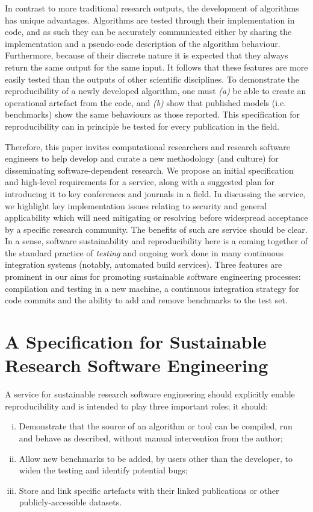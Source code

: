 \documentclass[conference]{IEEEtran}
\begin{document}
In contrast to more traditional research outputs, the development of
algorithms has unique advantages. Algorithms are tested through their
implementation in code, and as such they can be accurately
communicated either by sharing the implementation and a pseudo-code
description of the algorithm behaviour. Furthermore, because of their
discrete nature it is expected that they always return the same output
for the same input. It follows that these features are more easily
tested than the outputs of other scientific disciplines. To
demonstrate the reproducibility of a newly developed algorithm, one
must {\emph{(a)}} be able to create an operational artefact from the
code, and {\emph{(b)}} show that published models (i.e. benchmarks)
show the same behaviours as those reported. This specification for
reproducibility can in principle be tested for every publication in
the field.

Therefore, this paper invites computational researchers and research
software engineers to help develop and curate a new methodology (and
culture) for disseminating software-dependent research. We propose an
initial specification and high-level requirements for a service, along
with a suggested plan for introducing it to key conferences and
journals in a field. In discussing the service, we highlight key
implementation issues relating to security and general applicability
which will need mitigating or resolving before widespread acceptance
by a specific research community.  The benefits of such are service
should be clear. In a sense, software sustainability and
reproducibility here is a coming together of the standard practice of
\emph{testing} and ongoing work done in many continuous integration
systems (notably, automated build services). Three features are
prominent in our aims for promoting sustainable software engineering
processes: compilation and testing in a new machine, a continuous
integration strategy for code commits and the ability to add and
remove benchmarks to the test set.

\section{A Specification for Sustainable Research Software Engineering}\label{spec}

A service for sustainable research software engineering should
explicitly enable reproducibility and is intended to play three important
roles; it should:

\begin{enumerate}[(i)]
\item Demonstrate that the source of an algorithm or tool can be
  compiled, run and behave as described, without manual intervention
  from the author; 
\item Allow new benchmarks to be added, by users other than
the developer, to widen the testing and identify potential bugs; 
\item Store and link specific artefacts with their linked
publications or other publicly-accessible datasets. 
\end{enumerate}
\end{document}

